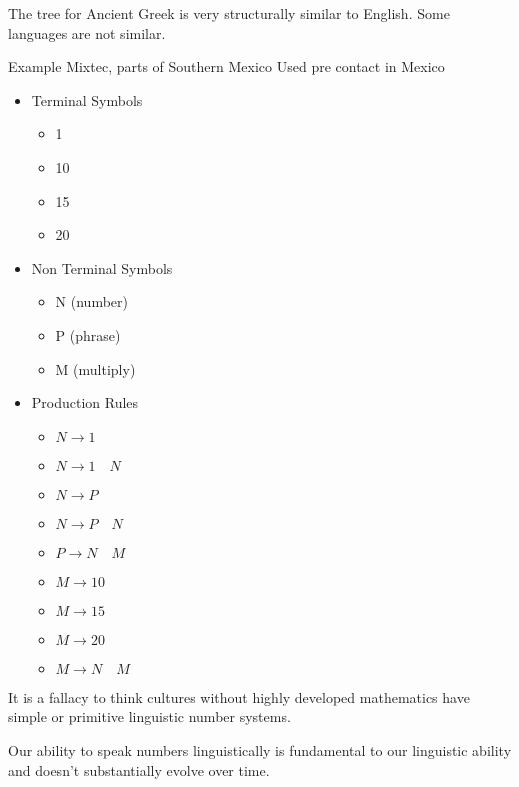 \documentclass{report}
\begin{document}
\begin{description}
\begin{mdframed}
            The tree for Ancient Greek is very structurally
            similar to English. Some languages are not
            similar.
        \end{mdframed}
    \item Example Mixtec, parts of Southern Mexico Used pre contact in Mexico
        \begin{mdframed}
            \begin{itemize}
                \item Terminal Symbols
                    \begin{itemize}
                        \item 1
                        \item 10
                        \item 15
                        \item 20
                    \end{itemize}
                \item Non Terminal Symbols
                    \begin{itemize}
                        \item N (number)
                        \item P (phrase)
                        \item M (multiply)
                    \end{itemize}
                \item Production Rules
                    \begin{itemize}
                        \item $N \to 1$
                        \item $N \to 1\quad N$
                        \item $N \to P$
                        \item $N \to P \quad N$
                        \item $P \to N \quad M$
                        \item $M \to 10$
                        \item $M \to 15$
                        \item $M \to 20$
                        \item $M \to N \quad M$
                    \end{itemize}
            \end{itemize}            
        \end{mdframed}
        \begin{mdframed}
            It is a fallacy to think cultures without highly developed
            mathematics have simple or primitive linguistic
            number systems. 

            Our ability to speak numbers linguistically is fundamental
            to our linguistic ability and doesn't substantially evolve
            over time.
        \end{mdframed}
\end{description}
\end{document}
